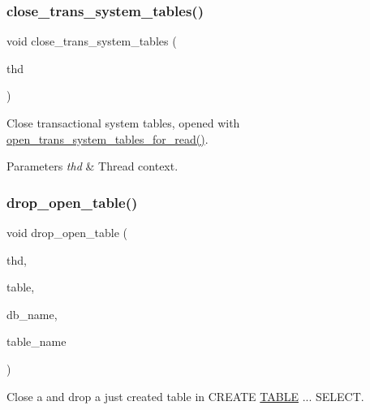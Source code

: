 \subsubsection{\texorpdfstring{close\+\_\+trans\+\_\+system\+\_\+tables()}{close\_trans\_system\_tables()}}
{\footnotesize\ttfamily void close\+\_\+trans\+\_\+system\+\_\+tables (\begin{DoxyParamCaption}\item[{T\+HD $\ast$}]{thd }\end{DoxyParamCaption})}

Close transactional system tables, opened with \mbox{\hyperlink{group__Data__Dictionary_gac315ba0102697b41bdeeff67a61240eb}{open\+\_\+trans\+\_\+system\+\_\+tables\+\_\+for\+\_\+read()}}.


\begin{DoxyParams}{Parameters}
{\em thd} & Thread context. \\
\hline
\end{DoxyParams}
\mbox{\label{group__Data__Dictionary_gac9f2e6710ec001734614f4a11cde9f0f}} 
\subsubsection{\texorpdfstring{drop\+\_\+open\+\_\+table()}{drop\_open\_table()}}
{\footnotesize\ttfamily void drop\+\_\+open\+\_\+table (\begin{DoxyParamCaption}\item[{T\+HD $\ast$}]{thd,  }\item[{\mbox{\hyperlink{structTABLE}{T\+A\+B\+LE}} $\ast$}]{table,  }\item[{const char $\ast$}]{db\+\_\+name,  }\item[{const char $\ast$}]{table\+\_\+name }\end{DoxyParamCaption})}

Close a and drop a just created table in C\+R\+E\+A\+TE \mbox{\hyperlink{structTABLE}{T\+A\+B\+LE}} ... S\+E\+L\+E\+CT.


